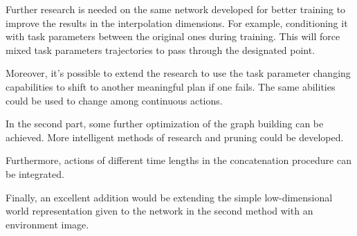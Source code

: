 Further research is needed on the same network developed for better training to improve the results in the interpolation dimensions. For example, conditioning it with task parameters between the original ones during training. This will force mixed task parameters trajectories to pass through the designated point. 

Moreover, it's possible to extend the research to use the task parameter changing capabilities to shift to another meaningful plan if one fails. The same abilities could be used to change among continuous actions.

In the second part, some further optimization of the graph building can be achieved. More intelligent methods of research and pruning could be developed. 

Furthermore, actions of different time lengths in the concatenation procedure can be integrated. 

Finally, an excellent addition would be extending the simple low-dimensional world representation given to the network in the second method with an environment image. 
